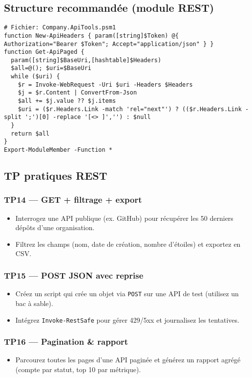 \documentclass[a4paper,12pt]{article}
\begin{document}
\subsection{Structure recommandée (module REST)}
\begin{verbatim}
# Fichier: Company.ApiTools.psm1
function New-ApiHeaders { param([string]$Token) @{ Authorization="Bearer $Token"; Accept="application/json" } }
function Get-ApiPaged {
  param([string]$BaseUri,[hashtable]$Headers)
  $all=@(); $uri=$BaseUri
  while ($uri) {
    $r = Invoke-WebRequest -Uri $uri -Headers $Headers
    $j = $r.Content | ConvertFrom-Json
    $all += $j.value ?? $j.items
    $uri = ($r.Headers.Link -match 'rel="next"') ? (($r.Headers.Link -split ';')[0] -replace '[<> ]','') : $null
  }
  return $all
}
Export-ModuleMember -Function *
\end{verbatim}

\subsection{TP pratiques REST}
\subsubsection{TP14 — GET + filtrage + export}
\begin{itemize}
  \item Interrogez une API publique (ex. GitHub) pour récupérer les 50 derniers dépôts d’une organisation.
  \item Filtrez les champs (nom, date de création, nombre d’étoiles) et exportez en CSV.
\end{itemize}

\subsubsection{TP15 — POST JSON avec reprise}
\begin{itemize}
  \item Créez un script qui crée un objet via \texttt{POST} sur une API de test (utilisez un bac à sable).
  \item Intégrez \texttt{Invoke-RestSafe} pour gérer 429/5xx et journalisez les tentatives.
\end{itemize}

\subsubsection{TP16 — Pagination \& rapport}
\begin{itemize}
  \item Parcourez toutes les pages d’une API paginée et générez un rapport agrégé (compte par statut, top 10 par métrique).
\end{itemize}
\end{document}
